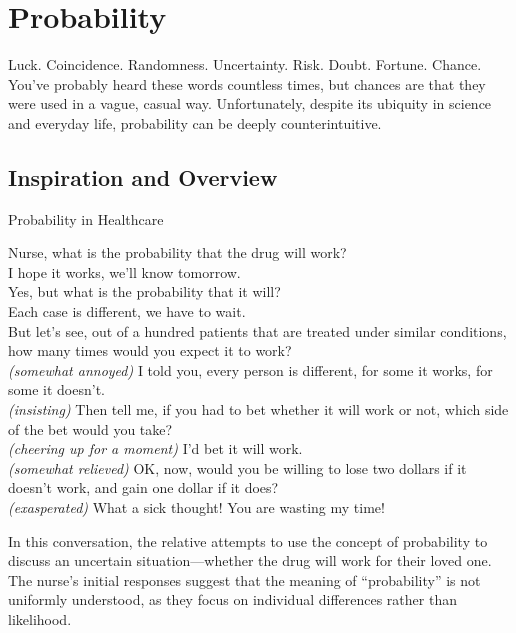 \chapter{Probability}

Luck. Coincidence. Randomness. Uncertainty. Risk. Doubt. Fortune. Chance. You’ve probably heard these words countless times, but chances are that they were
used in a vague, casual way. Unfortunately, despite its ubiquity in science and everyday life, probability can be deeply counterintuitive.

\section{Inspiration and Overview}
\begin{exampleboxbreak}{Probability in Healthcare}
\begin{dialogue}
 Nurse, what is the probability that the drug will work? \\
 I hope it works, we'll know tomorrow. \\
 Yes, but what is the probability that it will? \\ 
 Each case is different, we have to wait. \\
 But let's see, out of a hundred patients that are treated under similar conditions, how many times would you expect it to work? \\
 \emph{(somewhat annoyed)} I told you, every person is different, for some it works, for some it doesn't. \\
 \emph{(insisting)} Then tell me, if you had to bet whether it will work or not, which side of the bet would you take? \\
 \emph{(cheering up for a moment)} I'd bet it will work. \\
 \emph{(somewhat relieved)} OK, now, would you be willing to lose two dollars if it doesn't work, and gain one dollar if it does? \\
 \emph{(exasperated)} What a sick thought! You are wasting my time!
\end{dialogue}
\end{exampleboxbreak}

In this conversation, the relative attempts to use the concept of probability to discuss an uncertain situation—whether the drug will work for their loved one. The nurse's initial responses suggest that the meaning of ``probability'' is not uniformly understood, as they focus on individual differences rather than likelihood. 

